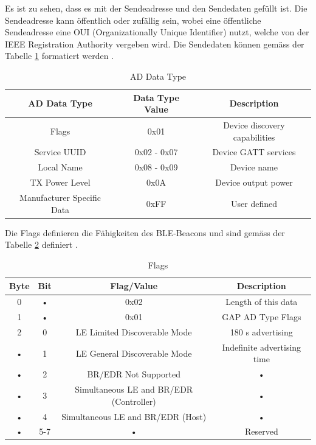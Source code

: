 Es ist zu sehen, dass es mit der Sendeadresse und den Sendedaten gefüllt ist. Die Sendeadresse kann öffentlich oder zufällig sein, wobei eine öffentliche Sendeadresse eine OUI (Organizationally Unique Identifier) nutzt, welche von der IEEE Registration Authority vergeben wird. Die Sendedaten können gemäss der  Tabelle \ref{tab:AD_Data_Type} formatiert werden \cite{9_Teildokument_BT}.

\begin{table}[htbp!!!]
\begin{tabular}{|c|c|c|}
\hline 
\rule[-1ex]{0pt}{2.5ex} AD Data Type & Data Type Value & Description \\ 
\hline 
\rule[-1ex]{0pt}{2.5ex} Flags & 0x01 & Device discovery capabilities \\ 
\hline 
\rule[-1ex]{0pt}{2.5ex} Service UUID & 0x02 - 0x07 & Device GATT services \\ 
\hline 
\rule[-1ex]{0pt}{2.5ex} Local Name & 0x08 - 0x09 & Device name \\ 
\hline 
\rule[-1ex]{0pt}{2.5ex} TX Power Level & 0x0A & Device output power \\ 
\hline 
\rule[-1ex]{0pt}{2.5ex} Manufacturer Specific Data & 0xFF & User defined \\ 
\hline 
\end{tabular} 
\caption[AD Data Type]{AD Data Type}
\label{tab:AD_Data_Type}
\end{table}

Die Flags definieren die Fähigkeiten des BLE-Beacons und sind gemäss der Tabelle \ref{tab:Flags} definiert \cite{9_Teildokument_BT}.

\begin{table}[htbp!!!]
\begin{tabular}{|c|c|c|c|}
\hline 
\rule[-1ex]{0pt}{2.5ex} Byte & Bit & Flag/Value & Description \\ 
\hline 
\rule[-1ex]{0pt}{2.5ex} 0 & • & 0x02 & Length of this data \\ 
\hline 
\rule[-1ex]{0pt}{2.5ex} 1 & • & 0x01 & GAP AD Type Flags \\ 
\hline 
\rule[-1ex]{0pt}{2.5ex} 2 & 0 & LE Limited Discoverable Mode & 180 s advertising \\ 
\hline 
\rule[-1ex]{0pt}{2.5ex} • & 1 & LE General Discoverable Mode & Indefinite advertising time \\ 
\hline 
\rule[-1ex]{0pt}{2.5ex} • & 2 & BR/EDR Not Supported & • \\ 
\hline 
\rule[-1ex]{0pt}{2.5ex} • & 3 & Simultaneous LE and BR/EDR (Controller) & • \\ 
\hline 
\rule[-1ex]{0pt}{2.5ex} • & 4 & Simultaneous LE and BR/EDR (Host) & • \\ 
\hline 
\rule[-1ex]{0pt}{2.5ex} • & 5-7 & • & Reserved \\ 
\hline 
\end{tabular} 
\caption[Flags]{Flags}
\label{tab:Flags}
\end{table}

